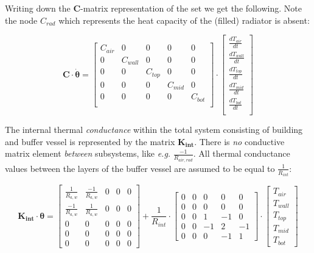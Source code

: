 Writing down the $\mathbf{C}$-matrix representation of the set we get the following. Note the node $C_{rad}$ which represents the heat capacity of the (filled) radiator is absent:

\begin{equation}
	\mathbf{C} \cdot \boldsymbol{\dot{\theta}} =
	\begin{bmatrix}
		C_{air} & 0 & 0 & 0 & 0  \\
		0 & C_{wall} & 0 & 0 & 0 \\
		0 & 0 & C_{top} & 0 & 0  \\
		0 & 0 & 0 & C_{mid} & 0  \\
		0 & 0 & 0 & 0 & C_{bot}  \\
	\end{bmatrix}
	\cdot
	\begin{bmatrix}
		\frac{dT_{air}}{dt}  \\
		\frac{dT_{wall}}{dt} \\
		\frac{dT_{top}}{dt}  \\
		\frac{dT_{mid}}{dt}  \\
		\frac{dT_{bot}}{dt}  \\
	\end{bmatrix}
\end{equation}

The internal thermal \emph{conductance} within the total system consisting of building and buffer vessel is represented by the matrix $\mathbf{K_{int}}$. There is \emph{no} conductive matrix element \emph{between} subsystems, like \textit{e.g.} $\frac{-1}{R_{air,rad}}$. All thermal conductance values between the layers of the buffer vessel are assumed to be equal to $\frac{1}{R_{int}}$:

\begin{equation}
	\mathbf{K_{int}} \cdot \boldsymbol{\theta} = 
	\begin{bmatrix}
		\frac{1}{R_{a,w}} & \frac{-1}{R_{a,w}} & 0 & 0 & 0 \\
		\frac{-1}{R_{a,w}} & \frac{1}{R_{a,w}} & 0 & 0 & 0 \\
		0 & 0 & 0 & 0 & 0 \\
		0 & 0 & 0 & 0 & 0 \\
		0 & 0 & 0 & 0 & 0  
	\end{bmatrix}
    +
	\frac{1}{R_{int}} \cdot
	\begin{bmatrix}
		0 & 0 & 0 & 0 & 0 \\
		0 & 0 & 0 & 0 & 0 \\
		0 & 0 & 1 & -1 & 0 \\
		0 & 0 & -1 & 2 & -1 \\
		0 & 0 & 0 & -1 & 1  
	\end{bmatrix}
    \cdot
	\begin{bmatrix}
		T_{air} \\
		T_{wall} \\
		T_{top} \\
		T_{mid} \\
		T_{bot}
	\end{bmatrix}
\end{equation}


